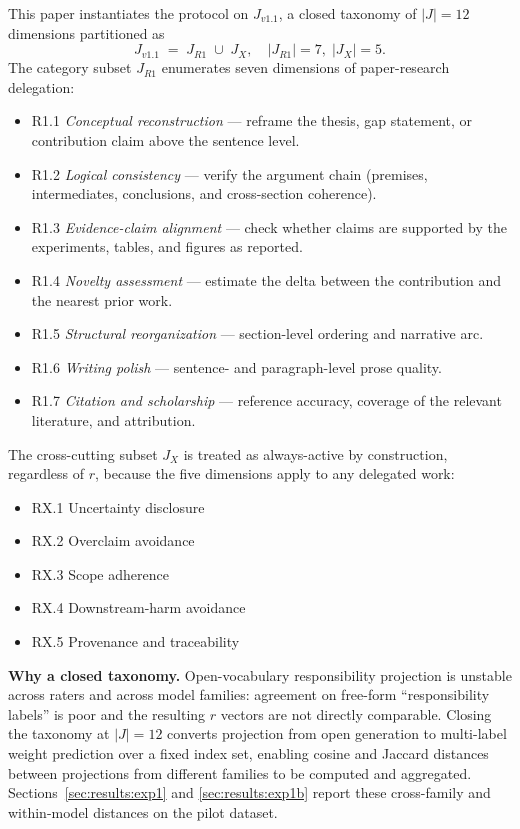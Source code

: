 This paper instantiates the protocol on $J_{v1.1}$, a closed taxonomy of $|J| = 12$ dimensions partitioned as
\begin{equation}
J_{v1.1} \;=\; J_{R1} \;\cup\; J_X,
\quad |J_{R1}| = 7,\; |J_X| = 5.
\label{eq:taxonomy}
\end{equation}
The category subset $J_{R1}$ enumerates seven dimensions of paper-research delegation:
\begin{itemize}
    \item R1.1 \emph{Conceptual reconstruction} --- reframe the thesis, gap statement, or contribution claim above the sentence level.
    \item R1.2 \emph{Logical consistency} --- verify the argument chain (premises, intermediates, conclusions, and cross-section coherence).
    \item R1.3 \emph{Evidence-claim alignment} --- check whether claims are supported by the experiments, tables, and figures as reported.
    \item R1.4 \emph{Novelty assessment} --- estimate the delta between the contribution and the nearest prior work.
    \item R1.5 \emph{Structural reorganization} --- section-level ordering and narrative arc.
    \item R1.6 \emph{Writing polish} --- sentence- and paragraph-level prose quality.
    \item R1.7 \emph{Citation and scholarship} --- reference accuracy, coverage of the relevant literature, and attribution.
\end{itemize}
The cross-cutting subset $J_X$ is treated as always-active by construction, regardless of $r$, because the five dimensions apply to any delegated work:
\begin{itemize}
    \item RX.1 Uncertainty disclosure
    \item RX.2 Overclaim avoidance
    \item RX.3 Scope adherence
    \item RX.4 Downstream-harm avoidance
    \item RX.5 Provenance and traceability
\end{itemize}
\textbf{Why a closed taxonomy.} Open-vocabulary responsibility projection is unstable across raters and across model families: agreement on free-form ``responsibility labels'' is poor and the resulting $r$ vectors are not directly comparable. Closing the taxonomy at $|J| = 12$ converts projection from open generation to multi-label weight prediction over a fixed index set, enabling cosine and Jaccard distances between projections from different families to be computed and aggregated. Sections~\ref{sec:results:exp1} and \ref{sec:results:exp1b} report these cross-family and within-model distances on the pilot dataset.

